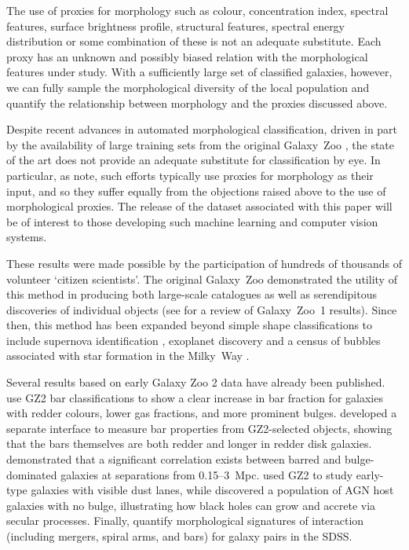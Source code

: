 \documentclass[useAMS,usenatbib]{mn2e}
\begin{document}
The use of proxies for morphology such as colour, concentration index, spectral features, surface brightness profile, structural features, spectral energy distribution or some combination of these is not an adequate substitute. Each proxy has an unknown and possibly biased relation with the morphological features under study. With a sufficiently large set of classified galaxies, however, we can fully sample the morphological diversity of the local population and quantify the relationship between morphology and the proxies discussed above. 

Despite recent advances in automated morphological classification, driven in part by the availability of large training sets from the original Galaxy~Zoo \citep{ban10,hue11,dav13}, the state of the art does not provide an adequate substitute for classification by eye. In particular, as \citet{lin11} note, such efforts typically use proxies for morphology as their input, and so they suffer equally from the objections raised above to the use of morphological proxies. The release of the dataset associated with this paper will be of interest to those developing such machine learning and computer vision systems. 

These results were made possible by the participation of hundreds of thousands of volunteer `citizen scientists'. The original Galaxy~Zoo demonstrated the utility of this method in producing both large-scale catalogues as well as serendipitous discoveries of individual objects (see \citealt{lin11} for a review of Galaxy~Zoo~1 results). Since then, this method has been expanded beyond simple shape classifications to include supernova identification \citep{smi11}, exoplanet discovery \citep{fis12,sch12} and a census of bubbles associated with star formation in the Milky~Way \citep{sim12a}. 

Several results based on early Galaxy Zoo 2 data have already been published. \citet{mas11c,mas12a} use GZ2 bar classifications to show a clear increase in bar fraction for galaxies with redder colours, lower gas fractions, and more prominent bulges. \citet{hoy11} developed a separate interface to measure bar properties from GZ2-selected objects, showing that the bars themselves are both redder and longer in redder disk galaxies. \citet{ski12} demonstrated that a significant correlation exists between barred and bulge-dominated galaxies at separations from 0.15--3~Mpc. \citet{kav12a} used GZ2 to study early-type galaxies with visible dust lanes, while \citet{sim13} discovered a population of AGN host galaxies with no bulge, illustrating how black holes can grow and accrete via secular processes. Finally, \citet{cas13} quantify morphological signatures of interaction (including mergers, spiral arms, and bars) for galaxy pairs in the SDSS. 
\end{document}
